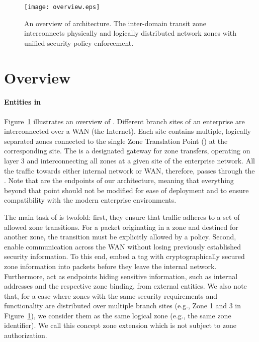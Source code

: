 \begin{figure}[t]
\begin{center}
\texttt{[image: overview.eps]}
\end{center}
\caption{An overview of \name architecture. The inter-domain transit zone interconnects physically
and logically distributed network zones with unified security policy enforcement.}
\label{fig:overview}
\end{figure}

\section{\name Overview}
\label{sec:overview}

\paragraph{Entities in \name}
Figure~\ref{fig:overview} illustrates an overview of \name. 
Different branch sites of an enterprise are interconnected over a WAN (\eg the Internet). Each site 
contains multiple, logically separated zones connected to the single Zone 
Translation Point (\tp) at the corresponding site. The \tp is a designated gateway 
for zone transfers, operating on layer 3 and interconnecting all zones at a given 
site of the enterprise network. All the traffic towards either internal network or 
WAN, therefore, passes through the \tp. Note that \tps are the endpoints
of our architecture, meaning that everything beyond that point should not be
modified for ease of deployment and to ensure compatibility with the modern enterprise 
environments.

The main task of \tps is twofold:
first, they ensure that traffic adheres to a set of allowed zone transitions. For 
a packet originating in a zone and destined for another zone, the transition must be 
explicitly allowed by a policy. Second, \tps enable communication across the WAN without
losing previously established security information. To this end, \tps embed a tag 
with cryptographically secured zone information into packets before they leave the 
internal network. Furthermore, \tps act as endpoints hiding sensitive information,
such as internal addresses and the respective zone binding, from external entities. 
We also note that, for a case where zones with the same security requirements and 
functionality are distributed over multiple branch sites (e.g., Zone 1 and 3 in 
Figure~\ref{fig:overview}),
we consider them as the same logical zone (e.g., the same zone identifier). We call
this concept zone extension which is not subject to zone authorization.

